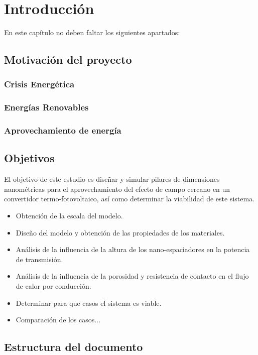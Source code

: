 \chapter{Introducción}

En este capítulo no deben faltar los siguientes apartados:

\section{Motivación del proyecto}

\subsection{Crisis Energética}

\subsection{Energías Renovables}

\subsection{Aprovechamiento de energía}




\section{Objetivos}
El objetivo de este estudio es diseñar y simular pilares de dimensiones nanométricas para el aprovechamiento del efecto de campo cercano en un convertidor termo-fotovoltaico, así como determinar la viabilidad de este sistema. 
\begin{itemize}
	\item Obtención de la escala del modelo.
	\item Diseño del modelo y obtención de las propiedades de los materiales.
	\item Análisis de la influencia de la altura de los nano-espaciadores en la potencia de transmisión.
	\item Análisis de la influencia de la porosidad y resistencia de contacto en el flujo de calor por conducción.
	\item Determinar para que casos el sistema es viable. 
	\item Comparación de los casos...
\end{itemize}


\section{Estructura del documento}


